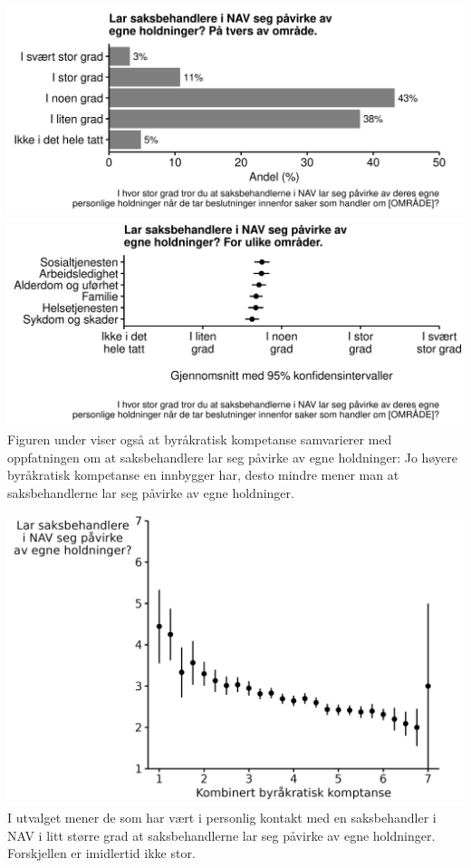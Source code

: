 \documentclass[
]{book}
\begin{document}
\includegraphics{figs/png/fig_nav_exp_attinfluence_all.png}
\includegraphics{figs/png/fig_nav_exp_attinfluence_area.png}
Figuren under viser også at byråkratisk kompetanse samvarierer med oppfatningen om at saksbehandlere lar seg påvirke av egne holdninger:
Jo høyere byråkratisk kompetanse en innbygger har, desto mindre mener man at saksbehandlerne lar seg påvirke av egne holdninger.

\includegraphics{figs/png/fig_attinfluence_by_be.png}
I utvalget mener de som har vært i personlig kontakt med en saksbehandler i NAV i litt større grad at saksbehandlerne lar seg påvirke av egne holdninger.
Forskjellen er imidlertid ikke stor.
\end{document}
